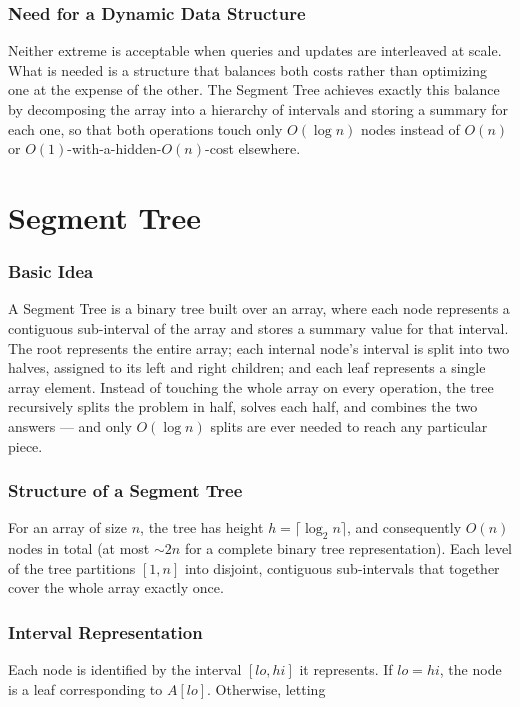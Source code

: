 \documentclass[11pt,open=any,headings=option]{scrreprt}
\begin{document}
\subsection{Need for a Dynamic Data Structure}
Neither extreme is acceptable when queries and updates are interleaved at scale. What is needed is a structure that balances both costs rather than optimizing one at the expense of the other. The Segment Tree achieves exactly this balance by decomposing the array into a hierarchy of intervals and storing a summary for each one, so that both operations touch only $O(\log n)$ nodes instead of $O(n)$ or $O(1)$-with-a-hidden-$O(n)$-cost elsewhere.

\chapter{Segment Tree}

\subsection{Basic Idea}
A Segment Tree is a binary tree built over an array, where each node represents a contiguous sub-interval of the array and stores a summary value for that interval. The root represents the entire array; each internal node's interval is split into two halves, assigned to its left and right children; and each leaf represents a single array element. Instead of touching the whole array on every operation, the tree recursively splits the problem in half, solves each half, and combines the two answers --- and only $O(\log n)$ splits are ever needed to reach any particular piece.

\subsection{Structure of a Segment Tree}
For an array of size $n$, the tree has height $h = \lceil \log_2 n \rceil$, and consequently $O(n)$ nodes in total (at most $\sim\!2n$ for a complete binary tree representation). Each level of the tree partitions $[1,n]$ into disjoint, contiguous sub-intervals that together cover the whole array exactly once.

\subsection{Interval Representation}
Each node is identified by the interval $[lo, hi]$ it represents. If $lo = hi$, the node is a leaf corresponding to $A[lo]$. Otherwise, letting
\end{document}
